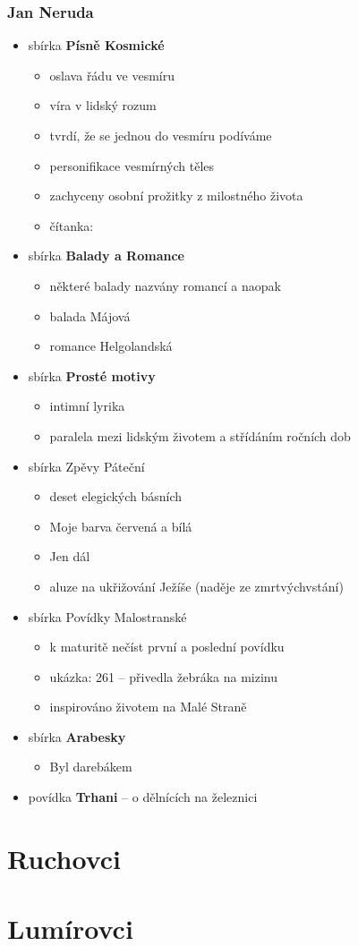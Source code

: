 \subsubsection{Jan Neruda}
\begin{itemize}
\item sbírka \textbf{Písně Kosmické}
	\begin{itemize}
	\item oslava řádu ve vesmíru
	\item víra v lidský rozum
	\item tvrdí, že se jednou do vesmíru podíváme
	\item personifikace vesmírných těles
	\item zachyceny osobní prožitky z milostného života
	\item čítanka: 
	\end{itemize}
\item sbírka \textbf{Balady a Romance}
	\begin{itemize}
	\item některé balady nazvány romancí a naopak
	\item balada Májová
	\item romance Helgolandská
	\end{itemize}
\item sbírka \textbf{Prosté motivy}
	\begin{itemize}
	\item intimní lyrika
	\item paralela mezi lidským životem a střídáním ročních dob
	\end{itemize}
\item sbírka Zpěvy Páteční
	\begin{itemize}
	\item deset elegických básních
	\item Moje barva červená a bílá
	\item Jen dál
	\item aluze na ukřižování Ježíše (naděje ze zmrtvýchvstání)
	\end{itemize}
\item sbírka Povídky Malostranské
	\begin{itemize}
	\item k maturitě nečíst první a poslední povídku
	\item ukázka: 261 -- přivedla žebráka na mizinu
	\item inspirováno životem na Malé Straně
	\end{itemize}
\item sbírka \textbf{Arabesky}
	\begin{itemize}
	\item Byl darebákem
	\end{itemize}
\item povídka \textbf{Trhani} -- o dělnících na železnici
\end{itemize}

\section{Ruchovci}
\section{Lumírovci}
